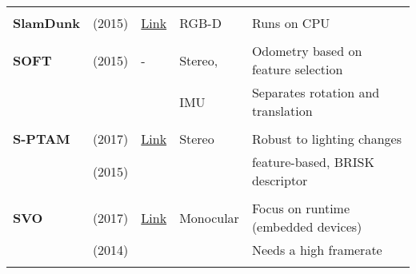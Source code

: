 \documentclass[a4paper,12pt]{scrartcl}
\begin{document}
{\begin{longtable}{l|l|l|l|l}
                           &                                   &                                                                    &                       &\\
    \textbf{SlamDunk}      & \cite{Fioraio2015} (2015)         & {\href{https://github.com/m4nh/skimap_ros}{Link}}                  & RGB-D                 & Runs on CPU\\
                           &                                   &                                                                    &                       &\\
    \textbf{SOFT}          & \cite{Cvisic2015} (2015)          & -                                                                  & Stereo,               & Odometry based on feature selection\\
                           &                                   &                                                                    & IMU                   & Separates rotation and translation\\
                           &                                   &                                                                    &                       &\\
    \textbf{S-PTAM}        & \cite{Pire2017} (2017)            & {\href{https://github.com/lrse/sptam}{Link}}                       & Stereo                & Robust to lighting changes\\
                           & \cite{Pire2015} (2015)            &                                                                    &                       & feature-based, BRISK descriptor\\
                           &                                   &                                                                    &                       &\\
    \textbf{SVO}           & \cite{Forster2017} (2017)         & {\href{https://github.com/uzh-rpg/rpg_svo}{Link}}                  & Monocular             & Focus on runtime (embedded devices)\\
                           & \cite{Forster2014a} (2014)        &                                                                    &                       & Needs a high framerate\\
                           &                                   &                                                                    &                       &\\

\end{longtable}}
\end{document}
